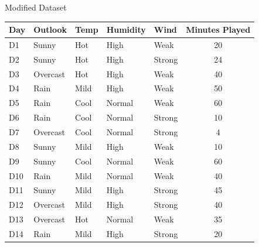 \documentclass[usenames,dvipsnames]{beamer}
\begin{document}
\begin{frame}{Modified Dataset}
\begin{table}[]
	\begin{tabular}{@{}lllllc@{}}
		\toprule
		\textbf{Day} & \textbf{Outlook} & \textbf{Temp} & \textbf{Humidity} & \textbf{Wind} & \textbf{Minutes Played} \\ \midrule
		D1           & Sunny            & Hot           & High              & Weak          & 20                      \\
		D2           & Sunny            & Hot           & High              & Strong        & 24                      \\
		D3           & Overcast         & Hot           & High              & Weak          & 40                      \\
		D4           & Rain             & Mild          & High              & Weak          & 50                      \\
		D5           & Rain             & Cool          & Normal            & Weak          & 60                      \\
		D6           & Rain             & Cool          & Normal            & Strong        & 10                      \\
		D7           & Overcast         & Cool          & Normal            & Strong        & 4                       \\
		D8           & Sunny            & Mild          & High              & Weak          & 10                      \\
		D9           & Sunny            & Cool          & Normal            & Weak          & 60                      \\
		D10          & Rain             & Mild          & Normal            & Weak          & 40                      \\
		D11          & Sunny            & Mild          & High              & Strong        & 45                      \\
		D12          & Overcast         & Mild          & High              & Strong        & 40                      \\
		D13          & Overcast         & Hot           & Normal            & Weak          & 35                      \\
		D14          & Rain             & Mild          & High              & Strong        & 20                      \\ \bottomrule
	\end{tabular}
\end{table}
\end{frame}
\end{document}

